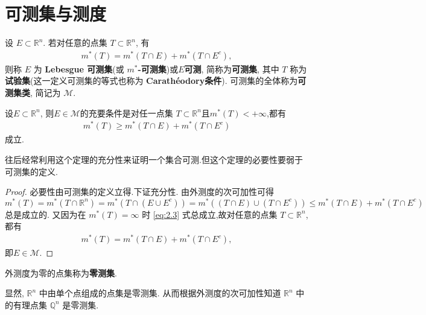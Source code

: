 \documentclass[../../main.tex]{subfiles}%
\begin{document}
\section{可测集与测度}

\begin{definition}[可测集]
设 \(E \subset \mathbb{R}^n\). 若对任意的点集 \(T \subset \mathbb{R}^n\), 有
\begin{align*}
m^*(T)=m^*(T \cap E)+m^*(T \cap E^c), 
\end{align*}
则称 \(E\) 为 \textbf{Lebesgue 可测集}(或 \textbf{\(m^*\)-可测集})或$E$\textbf{可测}, 简称为\textbf{可测集}, 其中 \(T\) 称为\textbf{试验集}(这一定义可测集的等式也称为 \textbf{Carathéodory条件}). 可测集的全体称为\textbf{可测集类}, 简记为 \(\mathscr{M}\). 
\end{definition}

\begin{theorem}[集合可测的充要条件]\label{theorem:可测的充要条件}
设\(E\subset \mathbb{R}^n\), 则$E\in \mathscr{M}$的充要条件是对任一点集 \(T \subset \mathbb{R}^n\)且\(m^*(T)< + \infty\),都有
\begin{align}
m^*(T) \geqslant  m^*(T \cap E)+m^*(T \cap E^c) \label{eq:2.3}
\end{align}
成立. 
\end{theorem}
\begin{remark}
往后经常利用这个定理的充分性来证明一个集合可测.但这个定理的必要性要弱于可测集的定义.
\end{remark}
\begin{proof}
必要性由可测集的定义立得.下证充分性.
由外测度的次可加性可得
\[
m^*(T)=m^*\left( T\cap \mathbb{R} ^n \right) =m^*\left( T\cap \left( E\cup E^c \right) \right) =m^*\left( \left( T\cap E \right) \cup \left( T\cap E^c \right) \right)  \leqslant  m^*(T \cap E)+m^*(T \cap E^c)
\]
总是成立的. 又因为在 \(m^*(T)=\infty\) 时 \eqref{eq:2.3} 式总成立,故对任意的点集 \(T \subset \mathbb{R}^n\),都有
\begin{align*}
m^*(T)=m^*(T \cap E)+m^*(T \cap E^c), 
\end{align*}
即$E\in \mathscr{M}$.
\end{proof}

\begin{definition}[零测集]
外测度为零的点集称为\textbf{零测集}. 
\end{definition}
\begin{remark}
显然, \(\mathbb{R}^n\) 中由单个点组成的点集是零测集. 从而根据外测度的次可加性知道 \(\mathbb{R}^n\) 中的有理点集 \(\mathbb{Q}^n\) 是零测集.
\end{remark}
\end{document}
